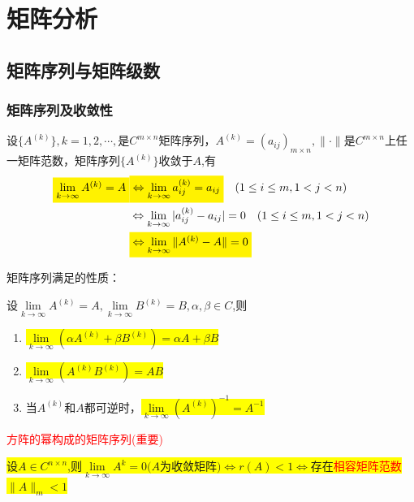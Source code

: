 \section{矩阵分析}
\subsection{矩阵序列与矩阵级数}
\subsubsection{矩阵序列及收敛性}
设$\{A^{(k)}\},k=1,2,\cdots,$是$C^{m\times n}$矩阵序列，$A^{(k)}=(a_{ij})_{m\times n},\|\cdot\|$是$C^{m\times n}$上任一矩阵范数，矩阵序列$\{A^{(k)}\}$收敛于$A$,有
\[
\begin{split}
 \colorbox{yellow}{$\lim\limits_{k\rightarrow \infty}A^{(k)}=A$} &\colorbox{yellow}{$\Leftrightarrow	\lim\limits_{k\rightarrow \infty}a_{ij}^{(k)}=a_{ij}$}\quad(1\leq i \leq m,1<j<n)   \\
	&\Leftrightarrow	\lim\limits_{k\rightarrow \infty}|a_{ij}^{(k)}-a_{ij}|=0\quad(1\leq i \leq m,1<j<n)\\
	&\colorbox{yellow}{$\Leftrightarrow	\lim\limits_{k\rightarrow \infty}\|A^{(k)}-A\|=0 $}
 \end{split}
\]

\noindent 矩阵序列满足的性质：
\begin{theorem}

	设$\lim\limits_{k\rightarrow \infty}A^{(k)}=A,\lim\limits_{k\rightarrow \infty}B^{(k)}=B,\alpha ,\beta\in C$,则
	\begin{enumerate}
		\item \colorbox{yellow}{$\lim\limits_{k\rightarrow \infty}(\alpha A^{(k)} +\beta B^{(k)})=\alpha A +\beta B$ }
		\item\colorbox{yellow}{$\lim\limits_{k\rightarrow \infty}(A^{(k)} B^{(k)})= AB$ }
		\item 当$A^{(k)}$和$A$都可逆时，\colorbox{yellow}{$\lim\limits_{k\rightarrow \infty}(A^{(k)})^{-1} = A^{-1}$}
	\end{enumerate}
\end{theorem}
\textcolor{red}{方阵的幂构成的矩阵序列(重要)}
\begin{theorem}
	\label{hhvcf}
\colorbox{yellow}{设$A\in C^{n\times n}$,则$\lim\limits_{k\rightarrow \infty}A^k=0\mbox{($A$为收敛矩阵)}\Leftrightarrow r(A)<1 \Leftrightarrow $存在\textcolor{red}{相容矩阵范数}$\|A\|_m<1$}
\end{theorem}
